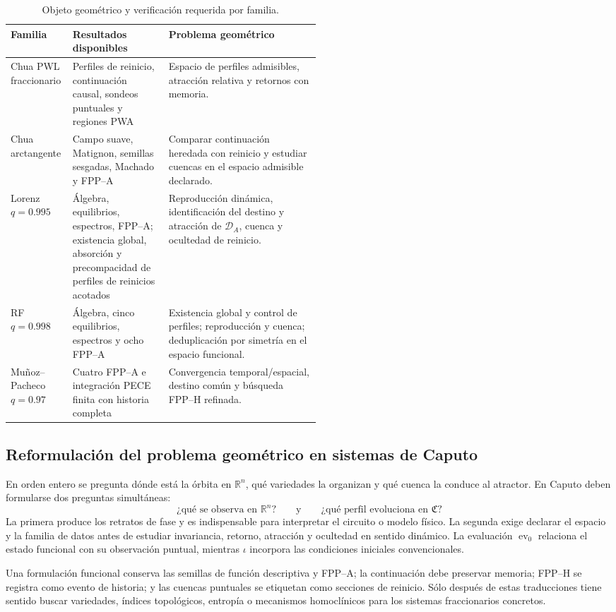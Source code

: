 \begin{table}[ht]
\centering
\small
\caption{Objeto geométrico y verificación requerida por familia.}
\label{tab:geofo-case-program}
\begin{tabularx}{\linewidth}{@{}L{0.20\linewidth}L{0.31\linewidth}Y@{}}
\toprule
Familia & Resultados disponibles & Problema geométrico \\
\midrule
Chua PWL fraccionario & Perfiles de reinicio, continuación causal, sondeos
puntuales y regiones PWA & Espacio de perfiles admisibles, atracción relativa
y retornos con memoria.\\
Chua arctangente & Campo suave, Matignon, semillas sesgadas, Machado y FPP--A &
Comparar continuación heredada con reinicio y estudiar cuencas en el espacio
admisible declarado.\\
Lorenz \(q=0.995\) & Álgebra, equilibrios, espectros, FPP--A; existencia
global, absorción y precompacidad de perfiles de reinicios acotados &
Reproducción dinámica, identificación del destino y atracción de
\(\mathcal D_A\), cuenca y ocultedad de reinicio.\\
RF \(q=0.998\) & Álgebra, cinco equilibrios, espectros y ocho FPP--A &
Existencia global y control de perfiles; reproducción y cuenca; deduplicación
por simetría en el espacio funcional.\\
Muñoz--Pacheco \(q=0.97\) & Cuatro FPP--A e integración PECE finita con historia completa &
Convergencia temporal/espacial, destino común y búsqueda FPP--H refinada.\\
\bottomrule
\end{tabularx}
\end{table}

\subsection{Reformulación del problema geométrico en sistemas de Caputo}

En orden entero se pregunta dónde está la órbita en \(\mathbb R^n\), qué
variedades la organizan y qué cuenca la conduce al atractor. En Caputo deben
formularse dos preguntas simultáneas:
\begin{equation}
 \text{¿qué se observa en }\mathbb R^n?
 \qquad\text{y}\qquad
 \text{¿qué perfil evoluciona en }\mathfrak C?
 \label{eq:geofo-two-geometric-questions}
\end{equation}
La primera produce los retratos de fase y es indispensable para interpretar el
circuito o modelo físico. La segunda exige declarar el espacio y la familia
de datos antes de estudiar invariancia, retorno, atracción y ocultedad en
sentido dinámico. La evaluación
\(\operatorname{ev}_0\) relaciona el estado funcional con su observación
puntual, mientras \(\iota\) incorpora las condiciones iniciales convencionales.

Una formulación funcional conserva las semillas de función descriptiva y
FPP--A; la continuación debe preservar
memoria; FPP--H se registra como evento de historia; y las cuencas puntuales se
etiquetan como secciones de reinicio. Sólo después de estas traducciones tiene
sentido buscar variedades, índices topológicos, entropía o mecanismos
homoclínicos para los sistemas fraccionarios concretos.
\fi
